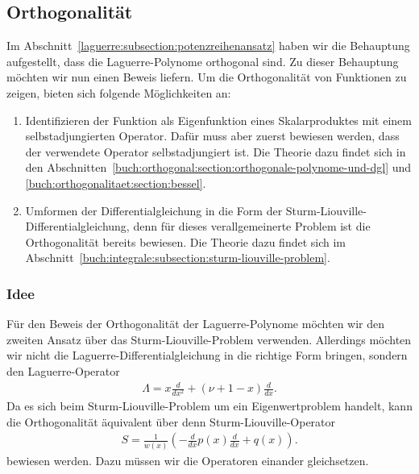 %
%
%
\subsection{Orthogonalität%
\label{laguerre:subsection:orthogonal}}
Im Abschnitt~\ref{laguerre:subsection:potenzreihenansatz}
haben wir die Behauptung aufgestellt,
dass die Laguerre-Polynome orthogonal sind.
Zu dieser Behauptung möchten wir nun einen Beweis liefern.
%
Um die Orthogonalität von Funktionen zu zeigen,
bieten sich folgende Möglichkeiten an:
\begin{enumerate}
\item Identifizieren der Funktion als Eigenfunktion eines Skalarproduktes
mit einem selbstadjungierten Operator.
Dafür muss aber zuerst bewiesen werden,
dass der verwendete Operator selbstadjungiert ist.
Die Theorie dazu findet sich in den
Abschnitten~\ref{buch:orthogonal:section:orthogonale-polynome-und-dgl} und
\ref{buch:orthogonalitaet:section:bessel}.
\item Umformen der Differentialgleichung in die Form der
Sturm-Liouville-Differentialgleichung,
denn für dieses verallgemeinerte Problem
ist die Orthogonalität bereits bewiesen.
Die Theorie dazu findet sich im Abschnitt~\ref{buch:integrale:subsection:sturm-liouville-problem}.
\end{enumerate}

\subsubsection{Idee}
Für den Beweis der Orthogonalität der Laguerre-Polynome möchten
wir den zweiten Ansatz über das Sturm-Liouville-Problem verwenden.
Allerdings möchten wir nicht die Laguerre-Differential\-glei\-chung
%
in die richtige Form bringen,
sondern den Laguerre-Operator
%
\begin{align}
\Lambda
=
x \frac{d}{dx^2} + (\nu + 1 -x) \frac{d}{dx}
\label{laguerre:lagop}
.
\end{align}
Da es sich beim Sturm-Liouville-Problem um ein Eigenwertproblem handelt,
kann die Orthogonalität äquivalent über denn Sturm-Liouville-Operator
\begin{align}
S
=
\frac{1}{w(x)} \left(-\frac{d}{dx}p(x) \frac{d}{dx} + q(x) \right).
\label{laguerre:slop}
\end{align}
bewiesen werden.
Dazu müssen wir die Operatoren einander gleichsetzen.

